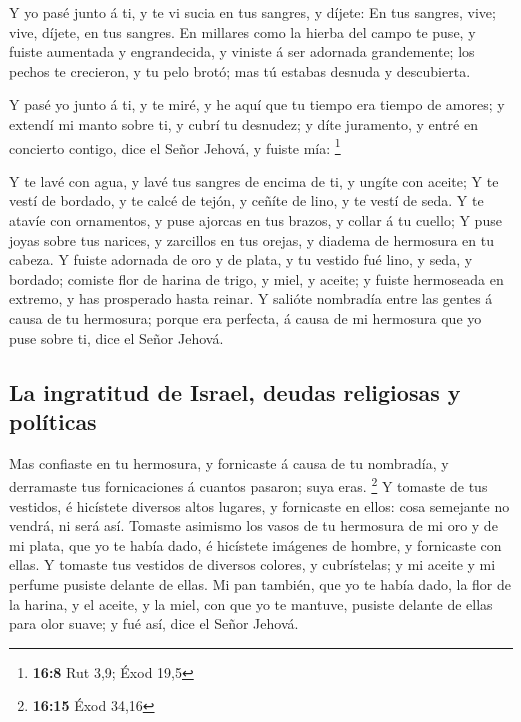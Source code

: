  Y yo pasé junto á ti, y te vi sucia en tus sangres, y
díjete: En tus sangres, vive; vive, díjete, en tus sangres.
 En millares como la hierba del campo te puse, y fuiste
aumentada y engrandecida, y viniste á ser adornada grandemente; los
pechos te crecieron, y tu pelo brotó; mas tú estabas desnuda y
descubierta.

 Y pasé yo junto á ti, y te miré, y he aquí que tu tiempo
era tiempo de amores; y extendí mi manto sobre ti, y cubrí tu desnudez;
y díte juramento, y entré en concierto contigo, dice el Señor Jehová, y
fuiste mía: \footnote{\textbf{16:8} Rut 3,9; Éxod 19,5}

 Y te lavé con agua, y lavé tus sangres de encima de ti, y
ungíte con aceite;  Y te vestí de bordado, y te calcé de
tejón, y ceñíte de lino, y te vestí de seda.  Y te atavíe
con ornamentos, y puse ajorcas en tus brazos, y collar á tu cuello;
 Y puse joyas sobre tus narices, y zarcillos en tus
orejas, y diadema de hermosura en tu cabeza.  Y fuiste
adornada de oro y de plata, y tu vestido fué lino, y seda, y bordado;
comiste flor de harina de trigo, y miel, y aceite; y fuiste hermoseada
en extremo, y has prosperado hasta reinar.  Y salióte
nombradía entre las gentes á causa de tu hermosura; porque era perfecta,
á causa de mi hermosura que yo puse sobre ti, dice el Señor Jehová.

\hypertarget{la-ingratitud-de-israel-deudas-religiosas-y-poluxedticas}{%
\subsection{La ingratitud de Israel, deudas religiosas y
políticas}\label{la-ingratitud-de-israel-deudas-religiosas-y-poluxedticas}}

 Mas confiaste en tu hermosura, y fornicaste á causa de
tu nombradía, y derramaste tus fornicaciones á cuantos pasaron; suya
eras. \footnote{\textbf{16:15} Éxod 34,16}  Y tomaste de
tus vestidos, é hicístete diversos altos lugares, y fornicaste en ellos:
cosa semejante no vendrá, ni será así.  Tomaste asimismo
los vasos de tu hermosura de mi oro y de mi plata, que yo te había dado,
é hicístete imágenes de hombre, y fornicaste con ellas. 
Y tomaste tus vestidos de diversos colores, y cubrístelas; y mi aceite y
mi perfume pusiste delante de ellas.  Mi pan también, que
yo te había dado, la flor de la harina, y el aceite, y la miel, con que
yo te mantuve, pusiste delante de ellas para olor suave; y fué así, dice
el Señor Jehová.


